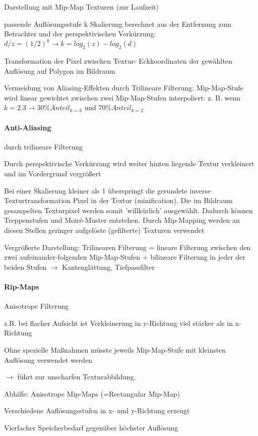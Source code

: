 \documentclass[landscape]{article}
\begin{document}
\begin{multicols}{3}
  Darstellung mit Mip-Map Texturen (zur Laufzeit)
  \begin{itemize*}
    \item passende Auflösungsstufe k Skalierung berechnet aus der Entfernung zum Betrachter und der perspektivischen Verkürzung: $d/z = (1/2)^k \rightarrow k = log_2(z)-log_2(d)$
    \item Transformation der Pixel zwischen Textur- Eckkoordinaten der gewählten Auflösung auf Polygon im Bildraum
    \item Vermeidung von Aliasing-Effekten durch Trilineare Filterung: Mip-Map-Stufe wird linear gewichtet zwischen zwei Mip-Map-Stufen interpoliert: z. B. wenn $k = 2.3 \rightarrow 30\% Anteil_{k=3}$ und $70\% Anteil_{k=2}$
  \end{itemize*}  
  
  \paragraph{Anti-Aliasing}
  durch trilineare Filterung
  \begin{itemize*}
    \item Durch perspektivische Verkürzung wird weiter hinten liegende Textur verkleinert und im Vordergrund vergrößert
    \item Bei einer Skalierung kleiner als 1 überspringt die gerundete inverse Texturtransformation Pixel in der Textur (minification). Die im Bildraum gesampelten Texturpixel werden somit 'willkürlich' ausgewählt. Dadurch können Treppenstufen und Moiré-Muster entstehen. Durch Mip-Mapping werden an diesen Stellen geringer aufgelöste (gefilterte) Texturen verwendet
    \item Vergrößerte Darstellung: Trilinearen Filterung = lineare Filterung zwischen den zwei aufeinander-folgenden Mip-Map-Stufen + bilineare Filterung in jeder der beiden Stufen $\rightarrow$ Kantenglättung, Tiefpassfilter
  \end{itemize*}
  
  \paragraph{Rip-Maps}
  Anisotrope Filterung
  \begin{itemize*}
    \item z.B. bei flacher Aufsicht ist Verkleinerung in y-Richtung viel stärker als in x-Richtung
    \item Ohne spezielle Maßnahmen müsste jeweils Mip-Map-Stufe mit kleinsten Auflösung verwendet werden
    \item $\rightarrow$ führt zur unscharfen Texturabbildung.
    \item Abhilfe: Anisotrope Mip-Maps (=Rectangular Mip-Map)
    \item Verschiedene Auflösungsstufen in x- und y-Richtung erzeugt
    \item Vierfacher Speicherbedarf gegenüber höchster Auflösung
  \end{itemize*}


\end{multicols}
\end{document}
